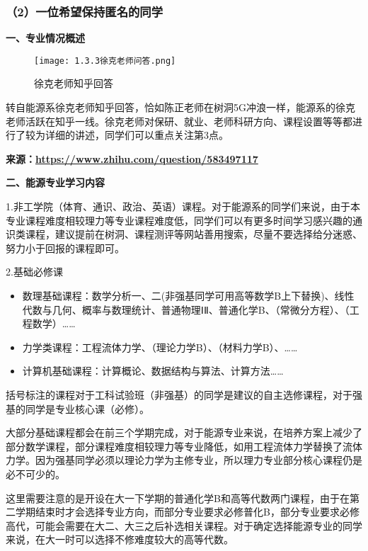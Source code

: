 \documentclass[11pt,oneside]{book}
\begin{document}
\subsubsection{（2）一位希望保持匿名的同学}
\textbf{一、专业情况概述}

\begin{figure}[htbp]
    \centering
    \texttt{[image: 1.3.3徐克老师问答.png]}
    \renewcommand{\figurename}{图}
    \caption{徐克老师知乎回答}
    \label{fig:enter-label}
\end{figure}

转自能源系徐克老师知乎回答，恰如陈正老师在树洞5G冲浪一样，能源系的徐克老师活跃在知乎一线。徐克老师对保研、就业、老师科研方向、课程设置等等都进行了较为详细的讲述，同学们可以重点关注第3点。

\textbf{来源：}\href{https://www.zhihu.com/question/583497117}{\textbf{https://www.zhihu.com/question/583497117}}

\textbf{二、能源专业学习内容}

1.非工学院（体育、通识、政治、英语）课程。对于能源系的同学们来说，由于本专业课程难度相较理力等专业课程难度低，同学们可以有更多时间学习感兴趣的通识类课程，建议提前在树洞、课程测评等网站善用搜索，尽量不要选择给分迷惑、努力小于回报的课程即可。

2.基础必修课

\begin{itemize}
    \item 数理基础课程：数学分析一、二(非强基同学可用高等数学B上下替换)、线性代数与几何、概率与数理统计、普通物理ⅠⅡ、普通化学B、（常微分方程）、（工程数学）……

    \item 力学类课程：工程流体力学、（理论力学B）、（材料力学B）、……

    \item 计算机基础课程：计算概论、数据结构与算法、计算方法……

\end{itemize}

括号标注的课程对于工科试验班（非强基）的同学是建议的自主选修课程，对于强基的同学是专业核心课（必修）。

大部分基础课程都会在前三个学期完成，对于能源专业来说，在培养方案上减少了部分数学课程，部分课程难度相较理力等专业降低，如用工程流体力学替换了流体力学。因为强基同学必须以理论力学为主修专业，所以理力专业部分核心课程仍是必不可少的。

这里需要注意的是开设在大一下学期的普通化学B和高等代数两门课程，由于在第二学期结束时才会选择专业方向，而部分专业要求必修普化B，部分专业要求必修高代，可能会需要在大二、大三之后补选相关课程。对于确定选择能源专业的同学来说，在大一时可以选择不修难度较大的高等代数。
\end{document}
